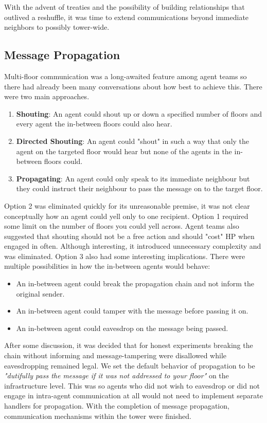\documentclass{article}
\begin{document}
With the advent of treaties and the possibility of building relationships that outlived a reshuffle, it was time to extend communications beyond immediate neighbors to possibly tower-wide.

\subsection{Message Propagation}
Multi-floor communication was a long-awaited feature among agent teams so there had already been many conversations about how best to achieve this. There were two main approaches.
\begin{enumerate}
    \item \textbf{Shouting}: An agent could shout up or down a specified number of floors and every agent the in-between floors could also hear.
    \item \textbf{Directed Shouting}: An agent could "shout" in such a way that only the agent on the targeted floor would hear but none of the agents in the in-between floors could.
    \item \textbf{Propagating}: An agent could only speak to its immediate neighbour but they could instruct their neighbour to pass the message on to the target floor.
\end{enumerate}
Option 2 was eliminated quickly for its unreasonable premise, it was not clear conceptually how an agent could yell only to one recipient. \newline
Option 1 required some limit on the number of floors you could yell across. Agent teams also suggested that shouting should not be a free action and should "cost" HP when engaged in often. Although interesting, it introduced unnecessary complexity and was eliminated. \newline
Option 3 also had some interesting implications. There were multiple possibilities in how the in-between agents would behave:
\begin{itemize}
    \item An in-between agent could break the propagation chain and not inform the original sender.
    \item An in-between agent could tamper with the message before passing it on.
    \item An in-between agent could eavesdrop on the message being passed.
\end{itemize}
After some discussion, it was decided that for honest experiments breaking the chain without informing and message-tampering were disallowed while eavesdropping remained legal. \newline
We set the default behavior of propagation to be \textit{"dutifully pass the message if it was not addressed to your floor"} on the infrastructure level. This was so agents who did not wish to eavesdrop or did not engage in intra-agent communication at all would not need to implement separate handlers for propagation. \newline
With the completion of message propagation, communication mechanisms within the tower were finished.
\end{document}
